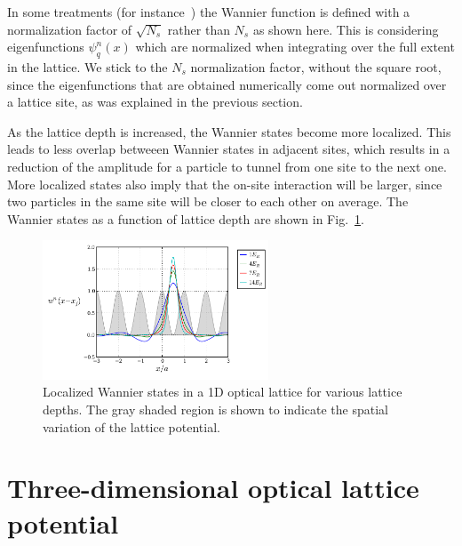 \documentclass[11pt,letter]{article}
\begin{document}
In some treatments (for instance~\cite{salomon2013many}) the Wannier function
is defined with a normalization factor of $\sqrt{N_{s}}$  rather than $N_{s}$
as shown here.   This is considering eigenfunctions $\psi_{q}^{n}(x)$ which are
normalized when integrating over the full extent in the lattice.  We stick to
the $N_{s}$ normalization factor, without the square root, since the
eigenfunctions that are obtained numerically come out normalized over a lattice
site, as was explained in the previous section. 


As the lattice depth is increased, the Wannier states become more localized.
This leads to less overlap betweeen Wannier states in adjacent sites, which
results in a reduction of the amplitude for a particle to tunnel from one site
to the next one.   More localized states also imply that the on-site
interaction will be larger, since two particles in the same site will be closer
to each other on average.   The Wannier states as a function of lattice depth
are shown in Fig.~\ref{fig:wannier1d_V0}.  
\begin{figure}
\centering \includegraphics[width=0.6\textwidth]{../BandStructure_figures/wannier1d_V0.pdf}
\caption[Wannier states in 1D lattice for various lattice depths.]{\small Localized Wannier states in a 1D
optical lattice for various lattice depths. The gray shaded region is shown to  indicate the spatial variation of the lattice potential.
} \label{fig:wannier1d_V0}
\end{figure}


\section{Three-dimensional optical lattice potential}
\end{document}
